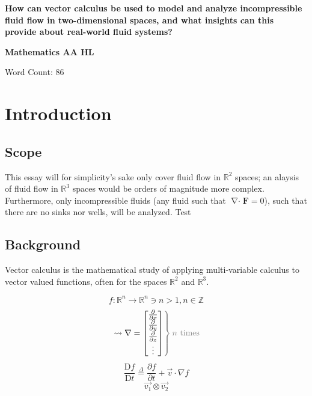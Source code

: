 \documentclass[a4paper, 12pt]{article} %
\newcommand{\fatf}{\mathbf{F}} %
\newcommand{\definedas}{\stackrel{\Delta}{=}} %
\newcommand{\partialder}[2]{\frac{\partial #1}{\partial #2}} %
\newcommand{\materialder}[2]{\frac{\mathrm{D} #1}{\mathrm{D} #2}} %
\DeclareMathOperator{\divergence}{\nabla\cdot} %
\begin{document}
\begin{titlepage} %
	\begin{center}
		\vspace*{0.5cm}
		\Large
		\textbf{How can vector calculus be used to model and analyze incompressible fluid flow in two-dimensional spaces, and what insights can this provide about real-world fluid systems?}

		\vspace{1.5cm}
		\large
		\textbf{Mathematics AA HL}

		\vspace{9cm}\color{darkgray}
		Word Count: 86 %
	\end{center}
\end{titlepage}

\tableofcontents\newpage %

\section{Introduction}
\subsection{Scope}
This essay will for simplicity's sake only cover fluid flow in $\mathbb{R}^2$ spaces; an alaysis of fluid flow in $\mathbb{R}^3$ spaces would be orders of magnitude more complex.
Furthermore, only incompressible fluids (any fluid such that $\divergence\fatf=0$), such that there are no sinks nor wells, will be analyzed. Test

\subsection{Background}
Vector calculus is the mathematical study of applying multi-variable calculus to vector valued functions, often for the spaces $\mathbb{R}^2$ and $\mathbb{R}^3$.

$$f:\mathbb{R}^n\rightarrow\mathbb{R}^n\ni n>1,n\in\mathbb{Z}$$
\begin{equation}
	\left.\leadsto\nabla=
	\left[\begin{matrix}
		\partialder{}{x} \\
		\partialder{}{y} \\
		\partialder{}{z} \\
		\vdots 	         \\
	\end{matrix}\right]
	\color{gray}\right\} \color{gray}n\text{ times}\color{black}
\end{equation}
\begin{equation}
	\materialder{f}{t}\definedas\partialder{f}{t}+\vec{v}\cdot\nabla f
\end{equation}
$$\vec{v_1}\otimes\vec{v_2}$$
\end{document}
